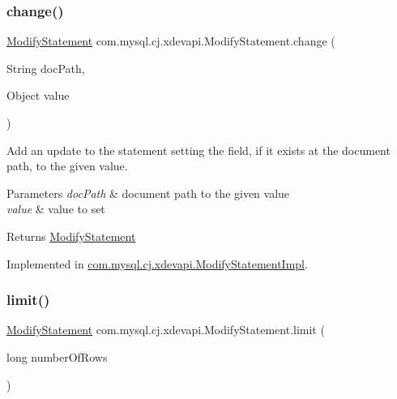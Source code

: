\subsubsection{\texorpdfstring{change()}{change()}}
{\footnotesize\ttfamily \mbox{\hyperlink{interfacecom_1_1mysql_1_1cj_1_1xdevapi_1_1_modify_statement}{Modify\+Statement}} com.\+mysql.\+cj.\+xdevapi.\+Modify\+Statement.\+change (\begin{DoxyParamCaption}\item[{String}]{doc\+Path,  }\item[{Object}]{value }\end{DoxyParamCaption})}

Add an update to the statement setting the field, if it exists at the document path, to the given value.


\begin{DoxyParams}{Parameters}
{\em doc\+Path} & document path to the given value \\
\hline
{\em value} & value to set \\
\hline
\end{DoxyParams}
\begin{DoxyReturn}{Returns}
\mbox{\hyperlink{interfacecom_1_1mysql_1_1cj_1_1xdevapi_1_1_modify_statement}{Modify\+Statement}} 
\end{DoxyReturn}


Implemented in \mbox{\hyperlink{classcom_1_1mysql_1_1cj_1_1xdevapi_1_1_modify_statement_impl_abd17a3775a262741791dd5688a0e480e}{com.\+mysql.\+cj.\+xdevapi.\+Modify\+Statement\+Impl}}.

\mbox{\label{interfacecom_1_1mysql_1_1cj_1_1xdevapi_1_1_modify_statement_a06d66de8b558408213f7efe0e84b55c0}} 
\subsubsection{\texorpdfstring{limit()}{limit()}}
{\footnotesize\ttfamily \mbox{\hyperlink{interfacecom_1_1mysql_1_1cj_1_1xdevapi_1_1_modify_statement}{Modify\+Statement}} com.\+mysql.\+cj.\+xdevapi.\+Modify\+Statement.\+limit (\begin{DoxyParamCaption}\item[{long}]{number\+Of\+Rows }\end{DoxyParamCaption})}

